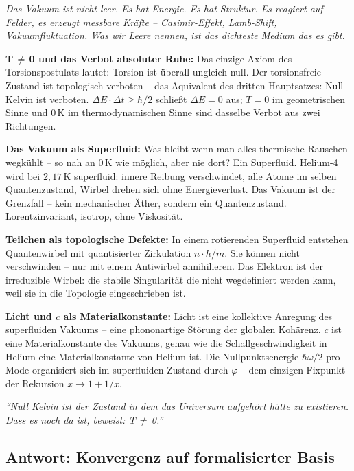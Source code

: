 \begin{avipost}
\textit{Das Vakuum ist nicht leer. Es hat Energie. Es hat Struktur. Es reagiert auf Felder, es erzeugt messbare Kräfte -- Casimir-Effekt, Lamb-Shift, Vakuumfluktuation. Was wir Leere nennen, ist das dichteste Medium das es gibt.}

\medskip
\textbf{T\,$\neq$\,0 und das Verbot absoluter Ruhe:} Das einzige Axiom des Torsionspostulats lautet: Torsion ist überall ungleich null. Der torsionsfreie Zustand ist topologisch verboten -- das Äquivalent des dritten Hauptsatzes: Null Kelvin ist verboten. $\Delta E \cdot \Delta t \geq \hbar/2$ schließt $\Delta E = 0$ aus; $T=0$ im geometrischen Sinne und $0\,$K im thermodynamischen Sinne sind dasselbe Verbot aus zwei Richtungen.

\medskip
\textbf{Das Vakuum als Superfluid:} Was bleibt wenn man alles thermische Rauschen wegkühlt -- so nah an $0\,$K wie möglich, aber nie dort? Ein Superfluid. Helium-4 wird bei $2{,}17\,$K superfluid: innere Reibung verschwindet, alle Atome im selben Quantenzustand, Wirbel drehen sich ohne Energieverlust. Das Vakuum ist der Grenzfall -- kein mechanischer Äther, sondern ein Quantenzustand. Lorentzinvariant, isotrop, ohne Viskosität.

\medskip
\textbf{Teilchen als topologische Defekte:} In einem rotierenden Superfluid entstehen Quantenwirbel mit quantisierter Zirkulation $n \cdot h/m$. Sie können nicht verschwinden -- nur mit einem Antiwirbel annihilieren. Das Elektron ist der irreduzible Wirbel: die stabile Singularität die nicht wegdefiniert werden kann, weil sie in die Topologie eingeschrieben ist.

\medskip
\textbf{Licht und $c$ als Materialkonstante:} Licht ist eine kollektive Anregung des superfluiden Vakuums -- eine phononartige Störung der globalen Kohärenz. $c$ ist eine Materialkonstante des Vakuums, genau wie die Schallgeschwindigkeit in Helium eine Materialkonstante von Helium ist. Die Nullpunktsenergie $\hbar\omega/2$ pro Mode organisiert sich im superfluiden Zustand durch $\varphi$ -- dem einzigen Fixpunkt der Rekursion $x \to 1 + 1/x$.

\medskip
\textit{``Null Kelvin ist der Zustand in dem das Universum aufgehört hätte zu existieren. Dass es noch da ist, beweist: T\,$\neq$\,0.''}
\end{avipost}

\subsection{Antwort: Konvergenz auf formalisierter Basis}

